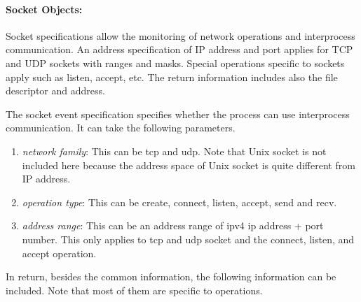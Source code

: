 \paragraph{Socket Objects:}
Socket specifications allow the monitoring of network operations and
interprocess communication. An address specification of IP address and
port applies for TCP and UDP sockets with ranges and masks.
Special operations specific
to sockets apply such as listen, accept, etc.
The return information includes also the file descriptor and address.

The socket event specification specifies whether the process
can use interprocess communication.
It can take the following parameters.
\begin{enumerate}
\item {\em network family}:
This can be tcp and udp.
Note that Unix socket is not included here
because the address space of Unix socket is quite different from IP address.

\item {\em operation type}:
This can be create, connect, listen, accept, send and recv.


\item {\em address range}:
This can be an address range of ipv4 ip address + port number.
This only applies to tcp and udp socket and the connect, listen, and accept operation.
\end{enumerate}

In return, besides the common information,
the following information can be included.
Note that most of them are specific to operations.

